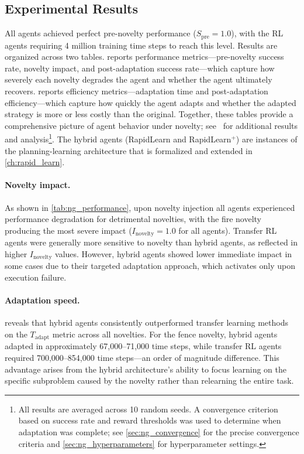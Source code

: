 \subsection{Experimental Results}
\label{sec:ng_results}

All agents achieved perfect pre-novelty performance ($S_\text{pre} = 1.0$), with the RL agents requiring 4 million training time steps to reach this level. Results are organized across two tables.  reports performance metrics---pre-novelty success rate, novelty impact, and post-adaptation success rate---which capture how severely each novelty degrades the agent and whether the agent ultimately recovers.  reports efficiency metrics---adaptation time and post-adaptation efficiency---which capture how quickly the agent adapts and whether the adapted strategy is more or less costly than the original. Together, these tables provide a comprehensive picture of agent behavior under novelty; see~\citet{goel2024novelgym} for additional results and analysis\footnote{All results are averaged across 10 random seeds. A convergence criterion based on success rate and reward thresholds was used to determine when adaptation was complete; see \cref{sec:ng_convergence} for the precise convergence criteria and \cref{sec:ng_hyperparameters} for hyperparameter settings.}. The hybrid agents (RapidLearn and RapidLearn$^+$) are instances of the planning-learning architecture that is formalized and extended in \cref{ch:rapid_learn}.







\paragraph{Novelty impact.} As shown in \cref{tab:ng_performance}, upon novelty injection all agents experienced performance degradation for detrimental novelties, with the fire novelty producing the most severe impact ($I_\text{novelty} = 1.0$ for all agents). Transfer RL agents were generally more sensitive to novelty than hybrid agents, as reflected in higher $I_\text{novelty}$ values. However, hybrid agents showed lower immediate impact in some cases due to their targeted adaptation approach, which activates only upon execution failure.

\paragraph{Adaptation speed.}  reveals that hybrid agents consistently outperformed transfer learning methods on the $T_\text{adapt}$ metric across all novelties. For the fence novelty, hybrid agents adapted in approximately 67{,}000--71{,}000 time steps, while transfer RL agents required 700{,}000--854{,}000 time steps---an order of magnitude difference. This advantage arises from the hybrid architecture's ability to focus learning on the specific subproblem caused by the novelty rather than relearning the entire task.


